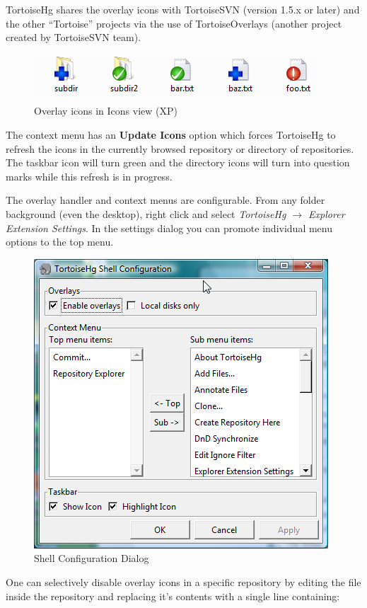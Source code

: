 \documentclass[letterpaper,10pt,english]{manual}
\begin{document}
TortoiseHg shares the overlay icons with TortoiseSVN (version 1.5.x or
later) and the other ``Tortoise'' projects via the use of TortoiseOverlays
(another project created by TortoiseSVN team).
\begin{figure}[htbp]
\centering

\includegraphics{overlayicons.png}
\caption{Overlay icons in Icons view (XP)}\end{figure}

The context menu has an \textbf{Update Icons} option which forces
TortoiseHg to refresh the icons in the currently browsed repository or
directory of repositories. The taskbar icon will turn green and the
directory icons will turn into question marks while this refresh is in
progress.

The overlay handler and context menus are configurable.  From any folder
background (even the desktop), right click and select
\emph{TortoiseHg \(\rightarrow\) Explorer Extension Settings}. In the settings
dialog you can promote individual menu options to the top menu.
\begin{figure}[htbp]
\centering

\includegraphics{taskbarui.png}
\caption{Shell Configuration Dialog}\end{figure}

One can selectively disable overlay icons in a specific repository by
editing the  file inside the repository and
replacing it's contents with a single line containing:
\end{document}
